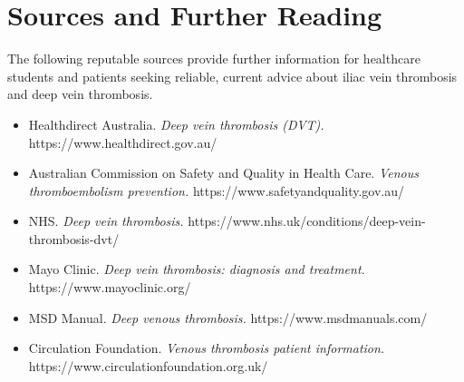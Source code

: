 \section*{Sources and Further Reading}
The following reputable sources provide further information for healthcare students and patients seeking reliable, current advice about iliac vein thrombosis and deep vein thrombosis.
\begin{itemize}
    \item Healthdirect Australia. \textit{Deep vein thrombosis (DVT).} https://www.healthdirect.gov.au/
    \item Australian Commission on Safety and Quality in Health Care. \textit{Venous thromboembolism prevention.} https://www.safetyandquality.gov.au/
    \item NHS. \textit{Deep vein thrombosis.} https://www.nhs.uk/conditions/deep-vein-thrombosis-dvt/
    \item Mayo Clinic. \textit{Deep vein thrombosis: diagnosis and treatment.} https://www.mayoclinic.org/
    \item MSD Manual. \textit{Deep venous thrombosis.} https://www.msdmanuals.com/
    \item Circulation Foundation. \textit{Venous thrombosis patient information.} https://www.circulationfoundation.org.uk/
\end{itemize}
